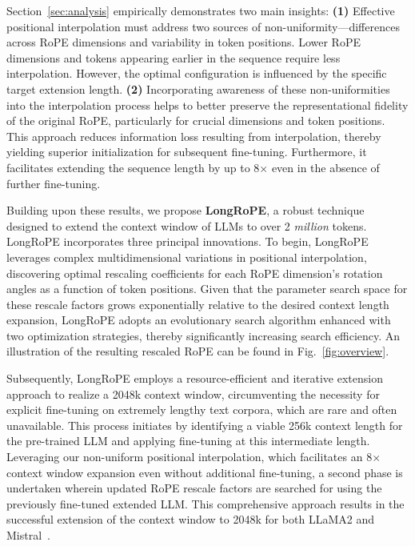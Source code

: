 Section~\ref{sec:analysis} empirically demonstrates two main insights: \textbf{(1)} Effective positional interpolation must address two sources of non-uniformity—differences across RoPE dimensions and variability in token positions. Lower RoPE dimensions and tokens appearing earlier in the sequence require less interpolation. However, the optimal configuration is influenced by the specific target extension length. \textbf{(2)} Incorporating awareness of these non-uniformities into the interpolation process helps to better preserve the representational fidelity of the original RoPE, particularly for crucial dimensions and token positions. This approach reduces information loss resulting from interpolation, thereby yielding superior initialization for subsequent fine-tuning. Furthermore, it facilitates extending the sequence length by up to 8$\times$ even in the absence of further fine-tuning.

Building upon these results, we propose \textbf{LongRoPE}, a robust technique designed to extend the context window of LLMs to over 2 \emph{million} tokens. LongRoPE incorporates three principal innovations. To begin, {LongRoPE} leverages complex multidimensional variations in positional interpolation, discovering optimal rescaling coefficients for each RoPE dimension’s rotation angles as a function of token positions. Given that the parameter search space for these rescale factors grows exponentially relative to the desired context length expansion, {LongRoPE} adopts an evolutionary search algorithm enhanced with two optimization strategies, thereby significantly increasing search efficiency. An illustration of the resulting rescaled RoPE can be found in Fig.~\ref{fig:overview}.

Subsequently, {LongRoPE} employs a resource-efficient and iterative extension approach to realize a 2048k context window, circumventing the necessity for explicit fine-tuning on extremely lengthy text corpora, which are rare and often unavailable. This process initiates by identifying a viable 256k context length for the pre-trained LLM and applying fine-tuning at this intermediate length. Leveraging our non-uniform positional interpolation, which facilitates an 8$\times$ context window expansion even without additional fine-tuning, a second phase is undertaken wherein updated RoPE rescale factors are searched for using the previously fine-tuned extended LLM. This comprehensive approach results in the successful extension of the context window to 2048k for both LLaMA2 and Mistral~\cite{mistral}.

